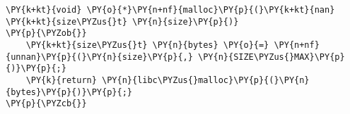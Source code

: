\begin{Verbatim}[commandchars=\\\{\},codes={\catcode`\$=3\catcode`\^=7\catcode`\_=8}]
\PY{k+kt}{void} \PY{o}{*}\PY{n+nf}{malloc}\PY{p}{(}\PY{k+kt}{nan} \PY{k+kt}{size\PYZus{}t} \PY{n}{size}\PY{p}{)}
\PY{p}{\PYZob{}}
    \PY{k+kt}{size\PYZus{}t} \PY{n}{bytes} \PY{o}{=} \PY{n+nf}{unnan}\PY{p}{(}\PY{n}{size}\PY{p}{,} \PY{n}{SIZE\PYZus{}MAX}\PY{p}{)}\PY{p}{;}
    \PY{k}{return} \PY{n}{libc\PYZus{}malloc}\PY{p}{(}\PY{n}{bytes}\PY{p}{)}\PY{p}{;}
\PY{p}{\PYZcb{}}
\end{Verbatim}
